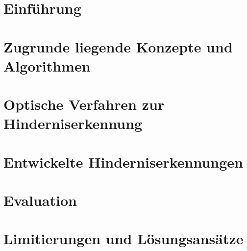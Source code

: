 \documentclass[pdftex,12pt,a4paper]{report}
\begin{document}
\chapter{Einführung}
\label{chp:introduction}



\chapter{Zugrunde liegende Konzepte und Algorithmen}
\label{chp:concepts}



\chapter{Optische Verfahren zur Hinderniserkennung}
\label{chp:stateoftheart}



\chapter{Entwickelte Hinderniserkennungen}
\label{chp:developed_algorithms}



\chapter{Evaluation}
\label{chp:evaluation}



\chapter{Limitierungen und Lösungsansätze}
\label{chp:conflicts}



%
\end{document}
